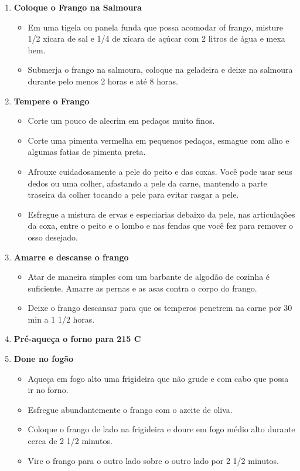 \documentclass [11pt, letterpaper] {article}
\begin{document}
\begin {description}
\begin {enumerate}
\item {\bf Coloque o Frango na Salmoura}
\begin {itemize}
\item Em uma tigela ou panela funda que possa acomodar of frango, misture 1/2 xícara de sal e 1/4 de xícara de açúcar com 2 litros de água e mexa bem.
\item Submerja o frango na salmoura, coloque na geladeira e deixe na salmoura durante pelo menos 2 horas e até 8 horas.
\end {itemize}

\item {\bf Tempere o Frango}
\begin {itemize}
\item Corte um pouco de alecrim em pedaços muito finos.
\item Corte uma pimenta vermelha em pequenos pedaços, esmague com alho e algumas fatias de pimenta preta.
\item Afrouxe cuidadosamente a pele do peito e das coxas. Você pode usar seus dedos ou uma colher, afastando a pele da carne, mantendo a parte traseira da colher tocando a pele para evitar rasgar a pele.
\item Esfregue a mistura de ervas e especiarias debaixo da pele, nas articulações da coxa, entre o peito e o lombo e nas fendas que você fez para remover o osso desejado.
\end {itemize}

\item {\bf Amarre e descanse o frango}
\begin {itemize}
\item Atar de maneira simples com um barbante de algod\~ao de cozinha  é suficiente. Amarre as pernas e as asas contra o corpo do frango.
\item Deixe o frango descansar para que os temperos penetrem na carne por 30 min a 1 1/2 horas.
\end {itemize}

\item {\bf Pré-aqueça o forno para 215 C}

\item {\bf Done no fog\~ao}
\begin {itemize}
\item Aqueça em fogo alto uma frigideira que n\~ao grude e com cabo que possa ir no forno.
\item Esfregue abundantemente o frango com o azeite de oliva.
\item Coloque o frango de lado na frigideira e doure em fogo médio alto durante cerca de 2 1/2 minutos.
\item Vire o frango para o outro lado sobre o outro lado por 2 1/2 minutos.
\end {itemize}


\end{enumerate}
\end{description}
\end{document}
